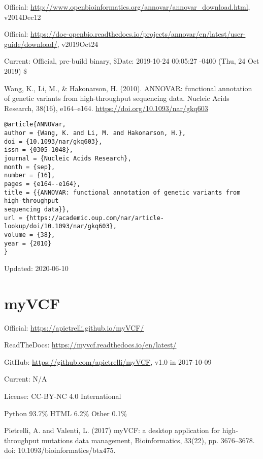 \documentclass[]{article}
\begin{document}
Official: \url{http://www.openbioinformatics.org/annovar/annovar_download.html}, v2014Dec12

Official: \url{https://doc-openbio.readthedocs.io/projects/annovar/en/latest/user-guide/download/}, v2019Oct24

Current: Official, pre-build binary, \$Date: 2019-10-24 00:05:27 -0400 (Thu, 24 Oct 2019) \$

Wang, K., Li, M., \& Hakonarson, H. (2010). ANNOVAR: functional annotation of genetic variants from high-throughput sequencing data. Nucleic Acids Research, 38(16), e164–e164. \url{https://doi.org/10.1093/nar/gkq603}

\begin{verbatim}
@article{ANNOVar,
author = {Wang, K. and Li, M. and Hakonarson, H.},
doi = {10.1093/nar/gkq603},
issn = {0305-1048},
journal = {Nucleic Acids Research},
month = {sep},
number = {16},
pages = {e164--e164},
title = {{ANNOVAR: functional annotation of genetic variants from high-throughput
sequencing data}},
url = {https://academic.oup.com/nar/article-lookup/doi/10.1093/nar/gkq603},
volume = {38},
year = {2010}
}
\end{verbatim}

Updated: 2020-06-10

\section{myVCF}

Official: \url{https://apietrelli.github.io/myVCF/}

ReadTheDocs: \url{https://myvcf.readthedocs.io/en/latest/}

GitHub: \url{https://github.com/apietrelli/myVCF}, v1.0 in 2017-10-09

Current: N/A

License: CC-BY-NC 4.0 International

Python 93.7\% HTML 6.2\% Other 0.1\%

Pietrelli, A. and Valenti, L. (2017) myVCF: a desktop application for high-throughput mutations data management, Bioinformatics, 33(22), pp. 3676–3678. doi: 10.1093/bioinformatics/btx475.
\end{document}

